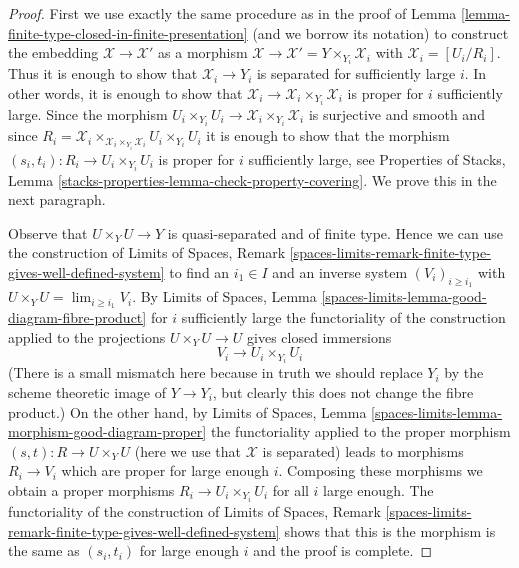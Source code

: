 \begin{proof}
First we use exactly the same procedure as in the proof of
Lemma \ref{lemma-finite-type-closed-in-finite-presentation}
(and we borrow its notation)
to construct the embedding $\mathcal{X} \to \mathcal{X}'$ as a morphism
$\mathcal{X} \to \mathcal{X}' = Y \times_{Y_i} \mathcal{X}_i$ with
$\mathcal{X}_i = [U_i/R_i]$.
Thus it is enough to show that $\mathcal{X}_i \to Y_i$ is
separated for sufficiently large $i$.
In other words, it is enough to show that
$\mathcal{X}_i \to \mathcal{X}_i \times_{Y_i} \mathcal{X}_i$
is proper for $i$ sufficiently large. Since the morphism
$U_i \times_{Y_i} U_i \to \mathcal{X}_i \times_{Y_i} \mathcal{X}_i$
is surjective and smooth and since
$R_i = \mathcal{X}_i
\times_{\mathcal{X}_i \times_{Y_i} \mathcal{X}_i} U_i \times_{Y_i} U_i$
it is enough to show that the morphism
$(s_i, t_i) : R_i \to U_i \times_{Y_i} U_i$
is proper for $i$ sufficiently large, see
Properties of Stacks, Lemma
\ref{stacks-properties-lemma-check-property-covering}.
We prove this in the next paragraph.

\medskip\noindent
Observe that $U \times_Y U \to Y$ is quasi-separated and of finite type.
Hence we can use the construction of 
Limits of Spaces, Remark
\ref{spaces-limits-remark-finite-type-gives-well-defined-system}
to find an $i_1 \in I$ and an inverse system $(V_i)_{i \geq i_1}$
with $U \times_Y U = \lim_{i \geq i_1} V_i$.
By Limits of Spaces, Lemma \ref{spaces-limits-lemma-good-diagram-fibre-product}
for $i$ sufficiently large the functoriality of the construction
applied to the projections $U \times_Y U \to U$
gives closed immersions
$$
V_i \to U_i \times_{Y_i} U_i
$$
(There is a small mismatch here because in truth we should replace
$Y_i$ by the scheme theoretic image of $Y \to Y_i$, but clearly this
does not change the fibre product.)
On the other hand, by Limits of Spaces, Lemma
\ref{spaces-limits-lemma-morphism-good-diagram-proper}
the functoriality applied to the proper morphism
$(s, t) : R \to U \times_Y U$ (here we use that $\mathcal{X}$ is separated)
leads to morphisms $R_i \to V_i$ which are proper for
large enough $i$.
Composing these morphisms we obtain a proper morphisms
$R_i \to U_i \times_{Y_i} U_i$ for all $i$ large enough.
The functoriality of the construction of
Limits of Spaces, Remark
\ref{spaces-limits-remark-finite-type-gives-well-defined-system}
shows that this is the morphism is the same as $(s_i, t_i)$
for large enough $i$ and the proof is complete.
\end{proof}







